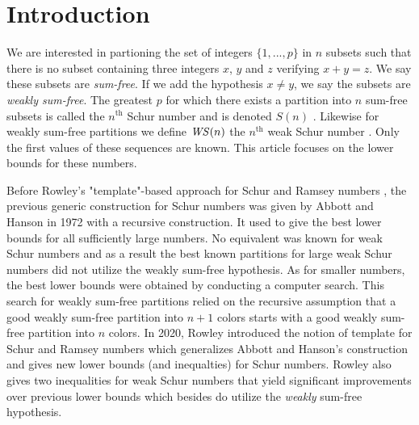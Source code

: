 \section{Introduction}

\qquad We are interested in partioning the set of integers \(\{1, ..., p\}\) in \(n\) subsets such that there is no 
subset containing three integers \(x\), \(y\) and \(z\) verifying \(x + y = z\). We say these subsets are 
\textit{sum-free}. If we add the hypothesis \(x \neq y\), we say the subsets are \textit{weakly sum-free}. The 
greatest \(p\) for which there exists a partition into \(n\) sum-free subsets is called the \(n^{\text{th}}\) Schur 
number and is denoted \(S(n)\) \cite{Schur1917}. Likewise for weakly sum-free partitions we define \(\mathit{WS}(n)\) 
the \(n^{\text{th}}\) weak Schur number \cite{Irving1973}. Only the first values of these sequences are known. 
This article focuses on the lower bounds for these numbers.

\par
Before Rowley's "template"-based approach for Schur and Ramsey numbers \cite{RowleyRamsey}, the 
previous generic construction for Schur numbers was given by Abbott and Hanson \cite{AbbottHanson} in 1972 
with a recursive construction. It used to give the best lower bounds for all sufficiently large numbers. No equivalent 
was known for weak Schur numbers and as a result the best known partitions for large weak Schur numbers 
did not utilize the weakly sum-free hypothesis. As for smaller numbers, the best lower bounds were obtained 
by conducting a computer search. This search for weakly sum-free partitions relied on the recursive assumption 
that a good weakly sum-free partition into \(n+1\) colors starts with a good weakly sum-free partition into \(n\) 
colors. In 2020, Rowley introduced the notion of template for Schur and Ramsey numbers which generalizes 
Abbott and Hanson's construction and gives new lower bounds (and inequalties) for Schur numbers. Rowley also 
gives two inequalities for weak Schur numbers \cite{RowleyWS} that yield significant improvements over previous 
lower bounds which besides do utilize the \textit{weakly} sum-free hypothesis.

\renewcommand{\arraystretch}{1.2}

